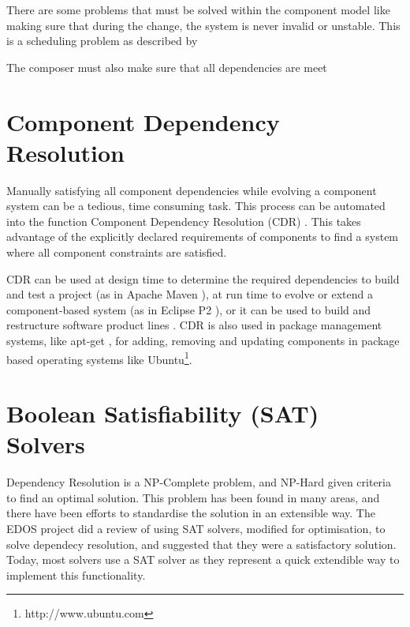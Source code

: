 

There are some problems that must be solved within the component model like making sure that during the change,
the system is never invalid or unstable. 
This is a scheduling problem as described by %

The composer must also make sure that all dependencies are meet

\section{Component Dependency Resolution}
Manually satisfying all component dependencies while evolving a component system can be a tedious, time consuming task.
This process can be automated into the function Component Dependency Resolution (CDR) \cite{Jenson2010}.
This takes advantage of the explicitly declared requirements of components to find a system where all component constraints are satisfied.

CDR can be used at design time to determine the required dependencies to build and test a project (as in Apache Maven \cite{casey_better_2008}),
at run time to evolve or extend a component-based system (as in Eclipse P2 \cite{leBerre2010}),
or it can be used to build and restructure software product lines \cite{savolainen_analyzing_2007}.
CDR is also used in package management systems, like apt-get \cite{Barth2005},
for adding, removing and updating components in package based operating systems like Ubuntu\footnote{http://www.ubuntu.com}. 


\section{Boolean Satisfiability (SAT) Solvers}

Dependency Resolution is a NP-Complete problem, and NP-Hard given criteria to find an optimal solution.
This problem has been found in many areas, and there have been efforts to standardise the solution in an extensible way.
The EDOS project did a review of using SAT solvers, modified for optimisation, to solve dependecy resolution, and suggested that they were a satisfactory solution.
Today, most solvers use a SAT solver as they represent a quick extendible way to implement this functionality.

